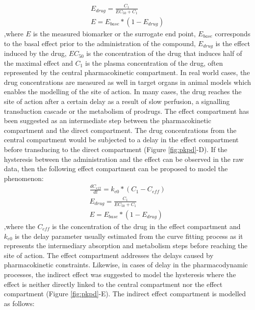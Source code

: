 \begin{equation}
\begin{gathered}
E_{drug}=\frac{C_{1}}{EC_{50}+C_{1}} \\
E = E_{base}*(1-E_{drug})
\end{gathered}
\end{equation}
,where $E$ is the measured biomarker or the surrogate end point, $E_{base}$ corresponds to the basal effect prior to the administration of the compound, $E_{drug}$ is the effect induced by the drug, $EC_{50}$ is the concentration of the drug that induces half of the maximal effect and $C_{1}$ is the plasma concentration of the drug, often represented by the central pharmacokinetic compartment. In real world cases, the drug concentrations are measured as well in target organs in animal models which enables the modelling of the site of action. In many cases, the drug reaches the site of action after a certain delay as a result of slow perfusion, a signalling transduction cascade or the metabolism of prodrugs. The effect compartment has been suggested \cite{sheiner1979simultaneous} as an intermediate step between the pharmacokinetic compartment and the direct compartment. The drug concentrations from the central compartment would be subjected to a delay in the effect compartment before transducing to the direct compartment (Figure \ref{fig:pkpd}-D). If the hysteresis between the administration and the effect can be observed in the raw data, then the following effect compartment can be proposed to model the phenomenon:
\begin{equation} 
\begin{gathered}
\frac{dC_{eff}}{dt}=k_{e0}*(C_{1}-C_{eff}) \\
E_{drug}=\frac{C_{1}}{EC_{50}+C_{1}} \\
E = E_{base}*(1-E_{drug})
\end{gathered}
\end{equation}
,where the $C_{eff}$ is the concentration of the drug in the effect compartment and $k_{e0}$ is the delay parameter usually estimated from the curve fitting process as it represents the intermediary absorption and metabolism steps before reaching the site of action. The effect compartment addresses the delays caused by pharmacokinetic constraints. Likewise, in cases of delay in the pharmacodynamic processes, the indirect effect was suggested \cite{sharma1998characteristics} to model the hysteresis where the effect is neither directly linked to the central compartment nor the effect compartment (Figure \ref{fig:pkpd}-E). The indirect effect compartment is modelled as follows:
